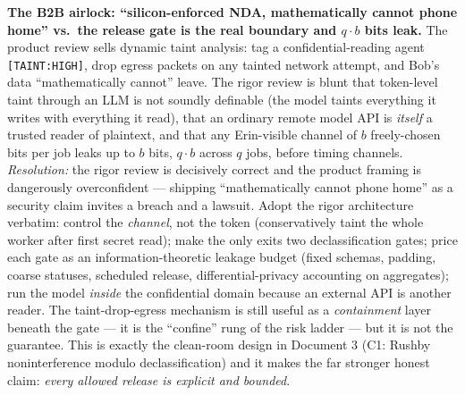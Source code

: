 \documentclass[11pt,a4paper]{article}
\begin{document}
\begin{adj}\textbf{The B2B airlock: ``silicon-enforced NDA, mathematically cannot phone home'' vs.\ the release gate is the real boundary and $q\cdot b$ bits leak.} The product review sells dynamic taint analysis: tag a confidential-reading agent \texttt{[TAINT:HIGH]}, drop egress packets on any tainted network attempt, and Bob's data ``mathematically cannot'' leave. The rigor review is blunt that token-level taint through an LLM is not soundly definable (the model taints everything it writes with everything it read), that an ordinary remote model API is \emph{itself} a trusted reader of plaintext, and that any Erin-visible channel of $b$ freely-chosen bits per job leaks up to $b$ bits, $q\cdot b$ across $q$ jobs, before timing channels. \emph{Resolution:} the rigor review is decisively correct and the product framing is dangerously overconfident --- shipping ``mathematically cannot phone home'' as a security claim invites a breach and a lawsuit. Adopt the rigor architecture verbatim: control the \emph{channel}, not the token (conservatively taint the whole worker after first secret read); make the only exits two declassification gates; price each gate as an information-theoretic leakage budget (fixed schemas, padding, coarse statuses, scheduled release, differential-privacy accounting on aggregates); run the model \emph{inside} the confidential domain because an external API is another reader. The taint-drop-egress mechanism is still useful as a \emph{containment} layer beneath the gate --- it is the ``confine'' rung of the risk ladder --- but it is not the guarantee. This is exactly the clean-room design in Document 3 (C1: Rushby noninterference modulo declassification) and it makes the far stronger honest claim: \emph{every allowed release is explicit and bounded}.
\end{adj}
\end{document}
